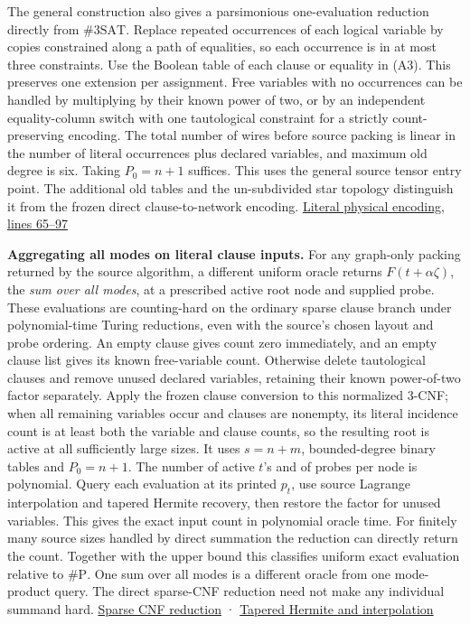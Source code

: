 \documentclass[
  11pt,
]{article}
\begin{document}
The general construction also gives a parsimonious one-evaluation
reduction directly from \(\#3\mathrm{SAT}\). Replace repeated
occurrences of each logical variable by copies constrained along a path
of equalities, so each occurrence is in at most three constraints. Use
the Boolean table of each clause or equality in (A3). This preserves one
extension per assignment. Free variables with no occurrences can be
handled by multiplying by their known power of two, or by an independent
equality-column switch with one tautological constraint for a strictly
count-preserving encoding. The total number of wires before source
packing is linear in the number of literal occurrences plus declared
variables, and maximum old degree is six. Taking \(P_0=n+1\) suffices.
This uses the general source tensor entry point. The additional old
tables and the un-subdivided star topology distinguish it from the
frozen direct clause-to-network encoding.
\href{https://github.com/openai/math/blob/main/preprints/The-Exponential-Time-Hypothesis-is-False-October-25-2026/build/quantitative-reduction.tex\#L65}{Literal
physical encoding, lines 65--97}

\textbf{Aggregating all modes on literal clause inputs.} For any
graph-only packing returned by the source algorithm, a different uniform
oracle returns \(F(t+\alpha\zeta)\), the \emph{sum over all modes}, at a
prescribed active root node and supplied probe. These evaluations are
counting-hard on the ordinary sparse clause branch under polynomial-time
Turing reductions, even with the source's chosen layout and probe
ordering. An empty clause gives count zero immediately, and an empty
clause list gives its known free-variable count. Otherwise delete
tautological clauses and remove unused declared variables, retaining
their known power-of-two factor separately. Apply the frozen clause
conversion to this normalized 3-CNF; when all remaining variables occur
and clauses are nonempty, its literal incidence count is at least both
the variable and clause counts, so the resulting root is active at all
sufficiently large sizes. It uses \(s=n+m\), bounded-degree binary
tables and \(P_0=n+1\). The number of active \(t\)'s and of probes per
node is polynomial. Query each evaluation at its printed \(p_t\), use
source Lagrange interpolation and tapered Hermite recovery, then restore
the factor for unused variables. This gives the exact input count in
polynomial oracle time. For finitely many source sizes handled by direct
summation the reduction can directly return the count. Together with the
upper bound this classifies uniform exact evaluation relative to
\(\#\mathrm P\). One sum over all modes is a different oracle from one
mode-product query. The direct sparse-CNF reduction need not make any
individual summand hard.
\href{https://github.com/openai/math/blob/main/preprints/The-Exponential-Time-Hypothesis-is-False-October-25-2026/build/quantitative-reduction.tex\#L65}{Sparse
CNF reduction} ·
\href{https://github.com/openai/math/blob/main/preprints/The-Exponential-Time-Hypothesis-is-False-October-25-2026/build/quantitative-contraction.tex\#L250}{Tapered
Hermite and interpolation}
\end{document}
